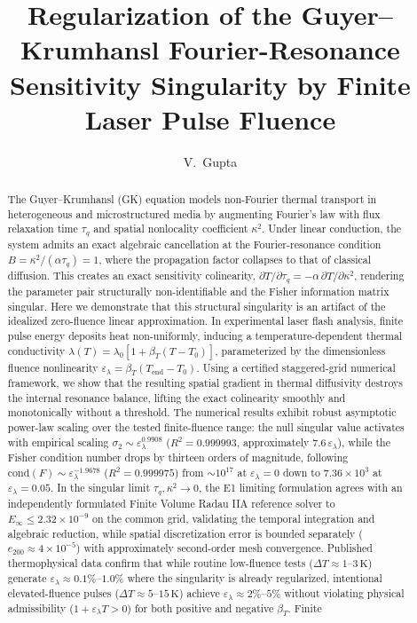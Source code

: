 \documentclass[preprint,12pt,a4paper]{elsarticle}
\begin{document}
\begin{frontmatter}

\title{Regularization of the Guyer--Krumhansl Fourier-Resonance Sensitivity Singularity by Finite Laser Pulse Fluence}

\author{V.~Gupta}
\address{Department of Mathematics, Gurugram University, Gurugram, Haryana 122018, India}

\begin{abstract}
The Guyer--Krumhansl (GK) equation models non-Fourier thermal transport in heterogeneous and microstructured media by augmenting Fourier's law with flux relaxation time $\tau_q$ and spatial nonlocality coefficient $\kappa^2$. Under linear conduction, the system admits an exact algebraic cancellation at the Fourier-resonance condition $B = \kappa^2/(\alpha \tau_q) = 1$, where the propagation factor collapses to that of classical diffusion. This creates an exact sensitivity colinearity, $\partial T/\partial \tau_q = -\alpha \, \partial T/\partial \kappa^2$, rendering the parameter pair structurally non-identifiable and the Fisher information matrix singular. Here we demonstrate that this structural singularity is an artifact of the idealized zero-fluence linear approximation. In experimental laser flash analysis, finite pulse energy deposits heat non-uniformly, inducing a temperature-dependent thermal conductivity $\lambda(T) = \lambda_0 [1 + \beta_T(T - T_0)]$, parameterized by the dimensionless fluence nonlinearity $\varepsilon_\lambda = \beta_T(T_{\mathrm{end}} - T_0)$. Using a certified staggered-grid numerical framework, we show that the resulting spatial gradient in thermal diffusivity destroys the internal resonance balance, lifting the exact colinearity smoothly and monotonically without a threshold. The numerical results exhibit robust asymptotic power-law scaling over the tested finite-fluence range: the null singular value activates with empirical scaling $\sigma_2 \sim \varepsilon_\lambda^{0.9908}$ ($R^2 = 0.999993$, approximately $7.6\,\varepsilon_\lambda$), while the Fisher condition number drops by thirteen orders of magnitude, following $\mathrm{cond}(F) \sim \varepsilon_\lambda^{-1.9678}$ ($R^2 = 0.999975$) from $\sim 10^{17}$ at $\varepsilon_\lambda = 0$ down to $7.36 \times 10^3$ at $\varepsilon_\lambda = 0.05$. In the singular limit $\tau_q, \kappa^2 \to 0$, the E1 limiting formulation agrees with an independently formulated Finite Volume Radau IIA reference solver to $E_\infty \le 2.32 \times 10^{-9}$ on the common grid, validating the temporal integration and algebraic reduction, while spatial discretization error is bounded separately ($e_{200} \approx 4 \times 10^{-5}$) with approximately second-order mesh convergence. Published thermophysical data confirm that while routine low-fluence tests ($\Delta T \approx 1$--$3\,\si{\kelvin}$) generate $\varepsilon_\lambda \approx 0.1\%$--$1.0\%$ where the singularity is already regularized, intentional elevated-fluence pulses ($\Delta T \approx 5$--$15\,\si{\kelvin}$) achieve $\varepsilon_\lambda \approx 2\%$--$5\%$ without violating physical admissibility ($1 + \varepsilon_\lambda \hat{T} > 0$) for both positive and negative $\beta_T$. Finite 
\end{abstract}
\end{frontmatter}
\end{document}
